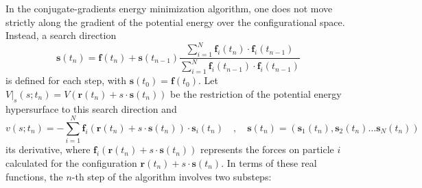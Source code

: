 \documentclass[10pt,a4paper,openany]{memoir}
\numberwithin{equation}{section}
\newcommand{\fsub}[1]{\mathbf{f}_{#1}}
\begin{document}
In the conjugate-gradients energy minimization algorithm, one does not move strictly along the gradient of the potential energy over the configurational space.
Instead, a search direction
\begin{equation}
  \label{eq:em-cg-search}
   \mathbf{s}(t_n) = \mathbf{f}(t_n) + \mathbf{s}(t_{n-1}) \frac{\sum_{i=1}^{N}\fsub{i}(t_n)\cdot\fsub{i}(t_{n-1})}{\sum_{i=1}^{N}\fsub{i}(t_{n-1})\cdot\fsub{i}(t_{n-1})} 
\end{equation}
is defined for each step, with $\mathbf{s}(t_0) = \mathbf{f}(t_0)$.
Let $V|_s(s;t_n) = V(\mathbf{r}(t_n) + s\cdot\mathbf{s}(t_n))$ be the restriction of the potential energy hypersurface to this search direction and
\begin{equation*}
  v(s;t_n) = - \sum_{i=1}^N \mathbf{f}_i(\mathbf{r}(t_n) + s\cdot\mathbf{s}(t_n)) \cdot \mathbf{s}_i(t_n) \quad , \quad \mathbf{s}(t_n) = (\mathbf{s}_1(t_n),\mathbf{s}_2(t_n) \ldots \mathbf{s}_N(t_n))
\end{equation*}
its derivative, where $\mathbf{f}_i(\mathbf{r}(t_n) + s\cdot\mathbf{s}(t_n))$ represents the forces on particle $i$ calculated for the configuration $\mathbf{r}(t_n) + s\cdot\mathbf{s}(t_n)$.
In terms of these real functions, the $n$-th step of the algorithm involves two substeps:
\end{document}
